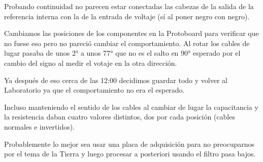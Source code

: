 Probando continuidad no parecen estar conectadas las cabezas de la salida de la referencia interna con la de la entrada de voltaje (sí al poner negro con negro). 

Cambiamos las posiciones de los componentes en la Protoboard para verificar que no fuese eso pero no pareció cambiar el comportamiento. Al rotar los cables de lugar pasaba de unos 2° a unos 77° que no es el salto en 90° esperado por el cambio del signo al medir el votaje en la otra dirección. %

Ya después de eso cerca de las 12:00 decidimos guardar todo y volver al Laboratorio ya que el comportamiento no era el esperado. 

Incluso manteniendo el sentido de los cables al cambiar de lugar la capacitancia y la resistencia daban cuatro valores distintos, dos por cada posición (cables normales e invertidos). 

Probablemente lo mejor sea usar una placa de adquisición para no preocuparnos por el tema de la Tierra y luego procesar a posteriori usando el filtro pasa bajos. 